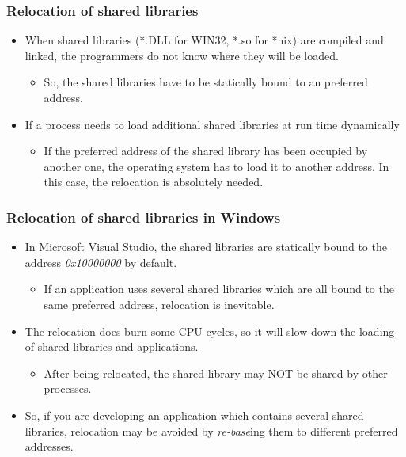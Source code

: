 \documentclass[CJKutf8,dvipsnames,table]{beamer}
\begin{document}
\begin{CJK*}{UTF8}{song}
  \begin{frame}
    \frametitle{Relocation of shared libraries} \pause
    \begin{itemize}
    \item{When shared libraries (*.DLL for WIN32, *.so for *nix) are compiled and linked, the programmers do not know where they will be loaded.} \pause
      \begin{itemize}
      \item{So, the shared libraries have to be statically bound to an preferred address.} \pause
      \end{itemize}
    \item{If a process needs to load additional shared libraries at run time dynamically} \pause
      \begin{itemize}
      \item{If the preferred address of the shared library has been occupied by another one, the operating system has to load it to another address. In this case, the relocation is absolutely needed.}
      \end{itemize}
    \end{itemize}
  \end{frame}

  
  \begin{frame}
    \frametitle{Relocation of shared libraries in Windows} \pause
    \begin{itemize}
    \item{In Microsoft Visual Studio, the shared libraries are statically bound to the address \href{https://blogs.msdn.microsoft.com/oldnewthing/20121227-00/?p=5713/}{\emph{0x10000000}} by default.} \pause
      \begin{itemize}
      \item{If an application uses several shared libraries which are all bound to the same preferred address, relocation is inevitable.} \pause
      \end{itemize}
    \item{The relocation does burn some CPU cycles, so it will slow down the loading of shared libraries and applications.} \pause
      \begin{itemize}
      \item{After being relocated, the shared library may NOT be shared by other processes.} \pause
      \end{itemize}
    \item{So, if you are developing an application which contains several shared libraries, relocation may be avoided by \emph{re-base}ing them to different preferred addresses.}
    \end{itemize}
  \end{frame}
  

\end{CJK*}
\end{document}
